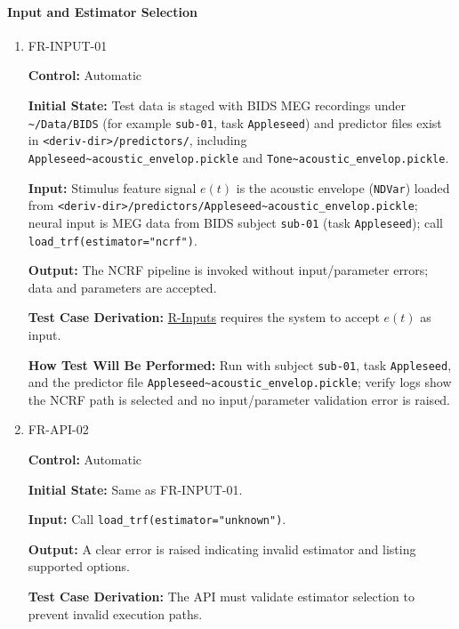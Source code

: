 \documentclass[12pt, titlepage]{article}
\begin{document}
\paragraph{Input and Estimator Selection}

\begin{enumerate}

\item{FR-INPUT-01\\}

\textbf{Control:} Automatic
					
\textbf{Initial State:} Test data is staged with BIDS MEG recordings under
\texttt{\textasciitilde/Data/BIDS} (for example \texttt{sub-01}, task
\texttt{Appleseed}) and predictor files exist in
\texttt{<deriv-dir>/predictors/}, including
\texttt{Appleseed\textasciitilde acoustic\_envelop.pickle} and
\texttt{Tone\textasciitilde acoustic\_envelop.pickle}.
					
\textbf{Input:} Stimulus feature signal $e(t)$ is the acoustic envelope
(\texttt{NDVar}) loaded from
\texttt{<deriv-dir>/predictors/Appleseed\textasciitilde acoustic\_envelop.pickle};
neural input is MEG data from BIDS subject \texttt{sub-01} (task
\texttt{Appleseed}); call \texttt{load\_trf(estimator="ncrf")}.
					
\textbf{Output:} The NCRF pipeline is invoked without input/parameter errors; data and parameters are accepted.

\textbf{Test Case Derivation:} \hyperref[R-Inputs]{R-Inputs} requires the system to accept $e(t)$ as input.
					
\textbf{How Test Will Be Performed:} Run with subject \texttt{sub-01}, task
\texttt{Appleseed}, and the predictor file
\texttt{Appleseed\textasciitilde acoustic\_envelop.pickle}; verify logs show the
NCRF path is selected and no input/parameter validation error is raised.
					
\item{FR-API-02\\}

\textbf{Control:} Automatic
					
\textbf{Initial State:} Same as FR-INPUT-01.
					
\textbf{Input:} Call \texttt{load\_trf(estimator="unknown")}.
					
\textbf{Output:} A clear error is raised indicating invalid estimator and listing supported options.

\textbf{Test Case Derivation:} The API must validate estimator selection to prevent invalid execution paths.


\end{enumerate}
\end{document}
